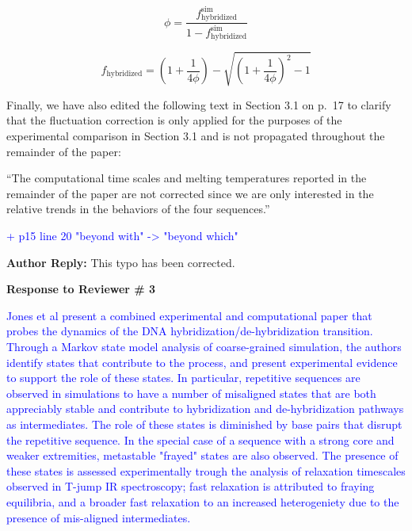 \documentclass[11pt,a4paper]{letter} %
\newcommand*{\rood}[1]{{\color{red}{#1}}}
\begin{document}
    \begin{equation}\label{}
    \phi = \frac{f_\mathrm{hybridized}^\mathrm{sim}}{1 - f_\mathrm{hybridized}^\mathrm{sim}}
    \end{equation}
    
    \begin{equation}\label{}
	f_\mathrm{hybridized} = (1+\frac{1}{4\phi}) - \sqrt{(1+\frac{1}{4\phi})^2 - 1}
	\end{equation}
	

Finally, we have also edited the following text in Section 3.1 on p.~17 to clarify that the fluctuation correction is only applied for the purposes of the experimental comparison in Section 3.1 and is not propagated throughout the remainder of the paper:

``The computational time scales and melting temperatures reported in the remainder of the paper are not corrected \rood{by these calibration corrections or finite-size fluctuation corrections} since we are only interested in the relative trends in the behaviors of the four sequences.''


\textcolor{blue}{+ p15 line 20 "beyond with" -> "beyond which"}

\textbf{Author Reply:}    This typo has been corrected.








\clearpage
\newpage

\begin{shaded}
\textbf{Response to Reviewer \# 3}
\end{shaded}

\textcolor{blue}{Jones et al present a combined experimental and computational paper that probes the dynamics of the DNA hybridization/de-hybridization transition. Through a Markov state model analysis of coarse-grained simulation, the authors identify states that contribute to the process, and present experimental evidence to support the role of these states. In particular, repetitive sequences are observed in simulations to have a number of misaligned states that are both appreciably stable and contribute to hybridization and de-hybridization pathways as intermediates. The role of these states is diminished by base pairs that disrupt the repetitive sequence. In the special case of a sequence with a strong core and weaker extremities, metastable "frayed" states are also observed. The presence of these states is assessed experimentally trough the analysis of relaxation timescales observed in T-jump IR spectroscopy; fast relaxation is attributed to fraying equilibria, and a broader fast relaxation to an increased heterogeniety due to the presence of mis-aligned intermediates.}
\end{document}
